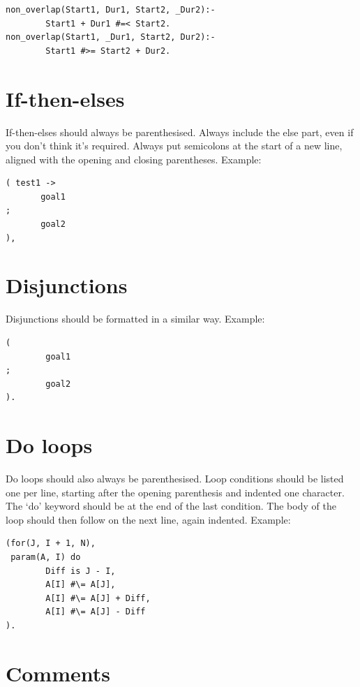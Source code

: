 \documentclass[a4paper,12pt]{report}
\begin{document}
\begin{verbatim}
non_overlap(Start1, Dur1, Start2, _Dur2):-
        Start1 + Dur1 #=< Start2.
non_overlap(Start1, _Dur1, Start2, Dur2):-
        Start1 #>= Start2 + Dur2.
\end{verbatim}

\section{If-then-elses}

If-then-elses should always be parenthesised. Always include the else part, even if you don't think
it's required. Always put semicolons at the start of a new line, aligned
with the opening and closing parentheses.  Example:

\begin{verbatim}
( test1 ->
       goal1
;
       goal2
),
\end{verbatim}
\section{Disjunctions}

Disjunctions should be formatted in a similar way.  Example:

\begin{verbatim}
(
        goal1
;
        goal2
).
\end{verbatim}

\section{Do loops}

Do loops should also always be parenthesised.  Loop conditions should be
listed one per line, starting after the opening parenthesis
and indented one character.  The `do' keyword should be at the end of the last condition.  The body of the
loop should then follow on the next line, again indented.  Example:

\begin{verbatim}
(for(J, I + 1, N),
 param(A, I) do
        Diff is J - I,
        A[I] #\= A[J],
        A[I] #\= A[J] + Diff,
        A[I] #\= A[J] - Diff
).
\end{verbatim}

\section{Comments}
\end{document}

